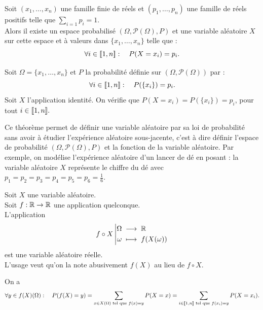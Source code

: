 \documentclass{book}
\begin{document}
\begin{Theoreme}
Soit $(x_1,\dots,x_n)$ une famille finie de réels et $(p_1,\dots,p_n)$ une famille de réels positifs telle que $\sum_{i=1} p_i = 1$.\\
Alors il existe un
espace probabilisé $(\Omega ,\mathcal{P}(\Omega) ,P)$ et une variable aléatoire  $X$ sur cette espace et à valeurs dans  $\{x_1,\dots,x_n\}$ telle que : 
$$ \forall i \in \mathopen\lbrack\!\lbrack1,n \mathclose\rbrack\!\rbrack:\quad  P( X = x_i ) = p_i.$$
\end{Theoreme}
\begin{Demonstration}
Soit $\Omega=\{x_1,\dots,x_n\}$ et $P$ la probabilité définie sur $(\Omega,\mathcal{P}(\Omega))$ par :
$$\forall i \in\mathopen\lbrack\!\lbrack1,n \mathclose\rbrack\!\rbrack:\quad P(\{x_i\})=p_i.$$
Soit $X$ l'application identité. On vérifie que   $P( X = x_i )=P(\{x_i\})=p_i$, pour tout $i\in \mathopen\lbrack\!\lbrack1,n \mathclose\rbrack\!\rbrack.$ 
\end{Demonstration}
\begin{Remarque}
Ce théorème permet de définir une variable aléatoire par sa loi de probabilité sans avoir à étudier l'expérience aléatoire sous-jacente, c'est à dire définir l'espace de probabilité $(\Omega,\mathcal{P}(\Omega),P)$ et la fonction de la variable aléatoire. Par exemple, on modélise l'expérience aléatoire d'un lancer de dé en posant : la variable aléatoire $X$ représente le chiffre du dé avec $p_1=p_2=p_3=p_4=p_5=p_6=\frac{1}{6}$.    
\end{Remarque}
\begin{DefinitionProposition}
Soit $X$ une variable aléatoire.\\
Soit $f:\mathbb{R}\to \mathbb{R}$ une application quelconque.\\
L'application 
\[ {f\circ  X}\left|\begin{aligned}{\Omega}&\;\longrightarrow\;{\mathbb{R}}\\{\omega}&\;\longmapsto\;{f(X(\omega))}\end{aligned}\right. \]
est une variable aléatoire réelle.\\
L'usage veut qu'on la note abusivement $f(X)$ au lieu de $f\circ X$.\\
\begin{center}
\end{center}
On a $$\forall y\in f(X)(\Omega):\quad P(f(X)=y)=\sum_{x\in X(\Omega) \text{ tel que }f(x)=y }P(X=x)= \sum_{i\in\mathopen\lbrack\!\lbrack1,n \mathclose\rbrack\!\rbrack \text{ tel que }f(x_i)=y }P(X=x_i).$$  
\end{DefinitionProposition}
\end{document}
